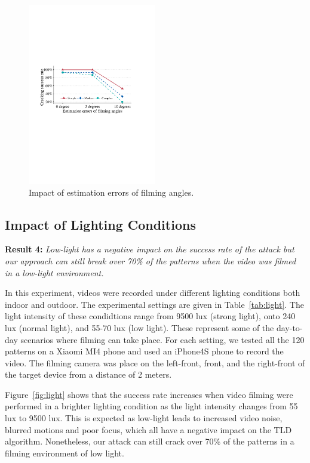      \begin{figure}[!t]
        \centering
        \includegraphics[width=0.5\textwidth]{fig/15.pdf}
        \caption{Impact of estimation errors of filming angles.}
        \label{fig:fig15}
    \end{figure}


    \subsection{Impact of Lighting Conditions \label{sec:light}}
    \noindent \textbf{Result 4:} \emph{Low-light has a negative impact on the success rate of the attack but our approach can still break over 70\% of the patterns when the video was filmed in a low-light environment.}

    In this experiment, videos were recorded under different lighting conditions both indoor and outdoor.
    The experimental settings are given in  Table~\ref{tab:light}.
    The light intensity of these condidtions range from 9500
    lux (strong light), onto 240 lux (normal light), and 55-70 lux (low light).
    These represent some of the day-to-day scenarios where filming can
    take place. For each setting, we tested all the 120 patterns on a Xiaomi MI4 phone and used
    an iPhone4S phone to record the video. The filming camera was place on the
    left-front, front, and the right-front of the target device from a distance
    of 2 meters.


    Figure~\ref{fig:light} shows that the success rate increases when video filming were performed in a brighter lighting condition as the light intensity
    changes from 55 lux to 9500 lux. This is expected as low-light leads to
    increased video noise, blurred motions and poor focus, which all have a
    negative impact on the TLD algorithm. Nonetheless, our attack
    can still crack over 70\% of the patterns in a filming
    environment of low light.

